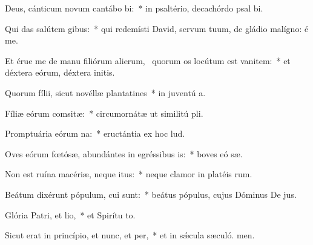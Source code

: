 \item Deus, cánticum novum cantábo bi:~* in psaltério, decachórdo psal bi.
\item Qui das salútem gibus:~* qui redemísti David, servum tuum, de gládio malígno: é me.
\item Et érue me de manu filiórum alierum,~\pscross{} quorum os locútum est vanitem:~* et déxtera eórum, déxtera initis.
\item Quorum fílii, sicut novéllæ plantatines~* in juventú a.
\item Fíliæ eórum comsitæ:~* circumornátæ ut similitú pli.
\item Promptuária eórum na:~* eructántia ex hoc  lud.
\item Oves eórum fœtósæ, abundántes in egréssibus is:~* boves eó sæ.
\item Non est ruína macériæ, neque itus:~* neque clamor in platéis rum.
\item Beátum dixérunt pópulum, cui  sunt:~* beátus pópulus, cujus Dóminus De jus.
\item Glória Patri, et lio,~* et Spirítu to.
\item Sicut erat in princípio, et nunc, et per,~* et in sǽcula sæculó. men.
